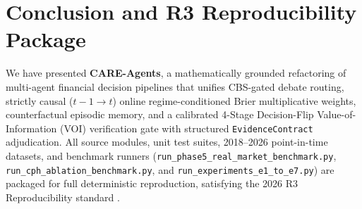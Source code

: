 \documentclass[10pt,a4paper,twocolumn]{article}
\begin{document}
\section{Conclusion and R3 Reproducibility Package}

We have presented \textbf{CARE-Agents}, a mathematically grounded refactoring of multi-agent financial decision pipelines that unifies CBS-gated debate routing, strictly causal ($t-1 \to t$) online regime-conditioned Brier multiplicative weights, counterfactual episodic memory, and a calibrated 4-Stage Decision-Flip Value-of-Information (VOI) verification gate with structured \texttt{EvidenceContract} adjudication. All source modules, unit test suites, 2018--2026 point-in-time datasets, and benchmark runners (\texttt{run\_phase5\_real\_market\_benchmark.py}, \texttt{run\_cph\_ablation\_benchmark.py}, and \texttt{run\_experiments\_e1\_to\_e7.py}) are packaged for full deterministic reproduction, satisfying the 2026 R3 Reproducibility standard \cite{xia2026audit}.
\end{document}
